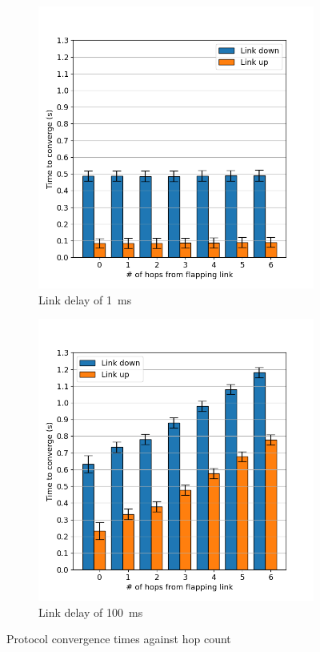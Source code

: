 \documentclass[withindex,glossary,openany]{cam-thesis}
\begin{document}
\begin{figure}
\centering
\begin{subfigure}{.5\textwidth}
  \centering
  \includegraphics[width=1\linewidth]{conv_1ms}
  \caption{Link delay of \SI{1}{\ms}}
  \label{fig:conv_1ms}
\end{subfigure}%
\begin{subfigure}{.5\textwidth}
  \centering
  \includegraphics[width=1\linewidth]{conv_100ms}
  \caption{Link delay of \SI{100}{\ms}}
  \label{fig:conv_100ms}
\end{subfigure}
\caption{Protocol convergence times against hop count}
\label{fig:conv}
\end{figure}
\end{document}
